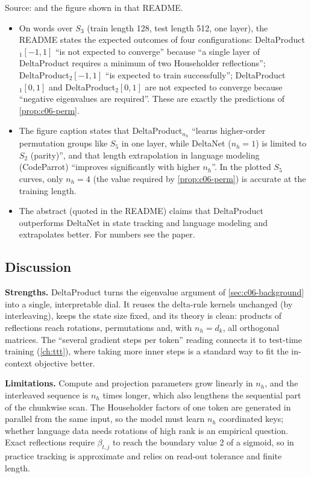 \begin{results}
Source:  and the figure
 shown in that README.
\begin{itemize}
\item On words over $S_3$ (train length 128, test length 512, one layer), the README states
the expected outcomes of four configurations: DeltaProduct$_1[-1,1]$ ``is not expected to
converge'' because ``a single layer of DeltaProduct requires a minimum of two Householder
reflections''; DeltaProduct$_2[-1,1]$ ``is expected to train successfully'';
DeltaProduct$_1[0,1]$ and DeltaProduct$_2[0,1]$ are not expected to converge because
``negative eigenvalues are required''. These are exactly the predictions of
\cref{prop:c06-perm}.
\item The figure caption states that DeltaProduct$_{n_h}$ ``learns higher-order permutation
groups like $S_5$ in one layer, while DeltaNet ($n_h=1$) is limited to $S_2$ (parity)'', and
that length extrapolation in language modeling (CodeParrot) ``improves significantly with
higher $n_h$''. In the plotted $S_5$ curves, only $n_h=4$ (the value required by
\cref{prop:c06-perm}) is accurate at the training length.
\item The abstract (quoted in the README) claims that DeltaProduct outperforms DeltaNet in
state tracking and language modeling and extrapolates better. For numbers see the paper.
\end{itemize}
\end{results}

\subsection{Discussion}

\textbf{Strengths.} DeltaProduct turns the eigenvalue argument of
\cref{sec:c06-background} into a single, interpretable dial. It reuses the delta-rule
kernels unchanged (by interleaving), keeps the state size fixed, and its theory is clean:
products of reflections reach rotations, permutations and, with $n_h=d_k$, all orthogonal
matrices. The ``several gradient steps per token'' reading connects it to test-time
training (\cref{ch:ttt}), where taking more inner steps is a standard way to fit the
in-context objective better.

\textbf{Limitations.} Compute and projection parameters grow linearly in $n_h$, and the
interleaved sequence is $n_h$ times longer, which also lengthens the sequential part of the
chunkwise scan. The Householder factors of one token are generated in parallel from the same
input, so the model must learn $n_h$ coordinated keys; whether language data needs
rotations of high rank is an empirical question. Exact reflections require
$\beta_{t,j}$ to reach the boundary value 2 of a sigmoid, so in practice tracking is
approximate and relies on read-out tolerance and finite length.

